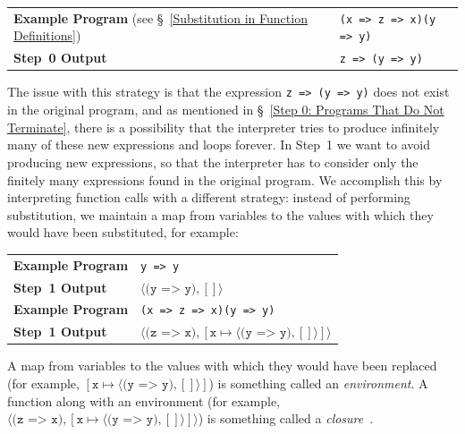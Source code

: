 \documentclass[12pt, oneside]{book}
\begin{document}
\begin{center}
\begin{tabular}{ll}
\textbf{Example Program} (see §~\ref{Substitution in Function Definitions}) & \texttt{(x => z => x)(y => y)} \\
\textbf{Step~0 Output} & \texttt{z => (y => y)} \\
\end{tabular}
\end{center}

The issue with this strategy is that the expression \texttt{z => (y => y)} does not exist in the original program, and as mentioned in §~\ref{Step 0: Programs That Do Not Terminate}, there is a possibility that the interpreter tries to produce infinitely many of these new expressions and loops forever. In Step~1 we want to avoid producing new expressions, so that the interpreter has to consider only the finitely many expressions found in the original program. We accomplish this by interpreting function calls with a different strategy: instead of performing substitution, we maintain a map from variables to the values with which they would have been substituted, for example:

\begin{center}
\begin{tabular}{ll}
\textbf{Example Program} & \texttt{y => y} \\
\textbf{Step~1 Output} & $\langle \texttt{(y => y)}, [] \rangle$ \\
\textbf{Example Program} & \texttt{(x => z => x)(y => y)} \\
\textbf{Step~1 Output} & $\langle \texttt{(z => x)}, [\texttt{x} \mapsto \langle \texttt{(y => y)}, [] \rangle] \rangle$ \\
\end{tabular}
\end{center}

\begin{mdframed}[frametitle = {Technical Terms}]
A map from variables to the values with which they would have been replaced (for example, $[\texttt{x} \mapsto \langle \texttt{(y => y)}, [] \rangle]$) is something called an \emph{environment}. A function along with an environment (for example, $\langle \texttt{(z => x)}, [\texttt{x} \mapsto \langle \texttt{(y => y)}, [] \rangle] \rangle$) is something called a \emph{closure}~\cite{closures}.
\end{mdframed}
\end{document}
